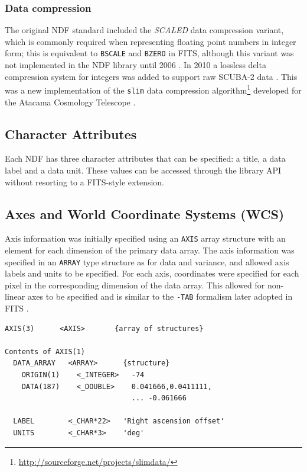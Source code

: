 \documentclass[final,authoryear,5p,times,twocolumn]{elsarticle}
\begin{document}
\subsubsection{Data compression}

The original NDF standard included the \emph{SCALED} data compression
variant, which is commonly required when representing floating point numbers in
integer form; this is equivalent to \texttt{BSCALE} and \texttt{BZERO} in
FITS, although this variant was not implemented in the NDF library
until 2006 \citep{2008ASPC..394..650C}. In 2010 a lossless delta
compression system for integers was added to support raw SCUBA-2 data
\citep{2013MNRAS.430.2513H}. This was a new implementation of the
\texttt{slim} data compression
algorithm\footnote{\url{http://sourceforge.net/projects/slimdata/}}
developed for the Atacama Cosmology Telescope
\citep{2004SPIE.5498....1F}.

\subsection{Character Attributes}

Each NDF has three character attributes that can be specified: a
title, a data label and a data unit. These values can be accessed
through the library API without resorting to a FITS-style extension.

\subsection{Axes and World Coordinate Systems (WCS)}

Axis information was initially specified using an \texttt{AXIS} array
structure with an element for each dimension of the primary data
array. The axis information was specified in an \texttt{ARRAY} type
structure as for data and variance, and allowed axis labels and units
to be specified. For each axis, coordinates were specified for each
pixel in the corresponding dimension of the data array. This allowed
for non-linear axes to be specified and is similar to the
\texttt{-TAB} formalism later adopted in FITS \citep{2006A&A...446..747G}.

{\small
\begin{verbatim}
AXIS(3)      <AXIS>       {array of structures}

Contents of AXIS(1)
  DATA_ARRAY   <ARRAY>      {structure}
    ORIGIN(1)    <_INTEGER>   -74
    DATA(187)    <_DOUBLE>    0.041666,0.0411111,
                              ... -0.061666

  LABEL        <_CHAR*22>   'Right ascension offset'
  UNITS        <_CHAR*3>    'deg'
\end{verbatim}
}
\end{document}
